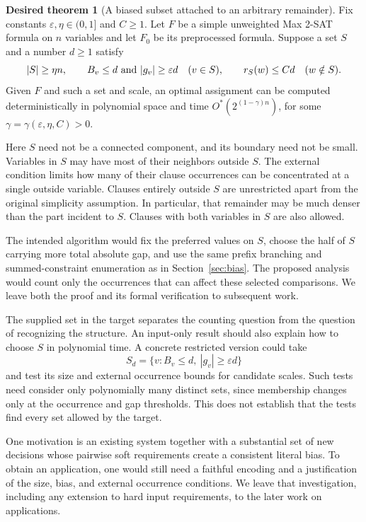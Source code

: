 \documentclass[11pt,a4paper]{article}
\theoremstyle{definition}
\newtheorem{target}[theorem]{Desired theorem}
\theoremstyle{remark}
\newcommand{\Ostar}{O^{*}}
\begin{document}
\begin{target}[A biased subset attached to an arbitrary remainder]
\label{target:biased_subset}
Fix constants $\varepsilon,\eta\in(0,1]$ and $C\ge1$.
Let $F$ be a simple unweighted Max 2-SAT formula on $n$ variables and
let $F_0$ be its preprocessed formula. Suppose a set $S$ and a number
$d\ge1$ satisfy
\[
 |S|\ge\eta n,\qquad
 B_v\le d\ \hbox{and}\ |g_v|\ge\varepsilon d\quad(v\in S),
 \qquad r_S(w)\le Cd\quad(w\notin S).
\]
Given $F$ and such a set and scale, an optimal assignment can be computed
deterministically in polynomial space and time
$\Ostar(2^{(1-\gamma)n})$, for some
$\gamma=\gamma(\varepsilon,\eta,C)>0$.
\end{target}

Here $S$ need not be a connected component, and its boundary need not
be small. Variables in $S$ may have most of their neighbors outside
$S$. The external condition limits how many of their clause occurrences
can be concentrated at a single outside variable. Clauses entirely
outside $S$ are unrestricted apart from the original simplicity
assumption. In particular, that remainder may be much denser than the
part incident to $S$. Clauses with both variables in $S$ are also allowed.

The intended algorithm would fix the preferred values on $S$, choose
the half of $S$ carrying more total absolute gap, and use the same
prefix branching and summed-constraint enumeration as in
Section~\ref{sec:bias}. The proposed analysis would count only the
occurrences that can affect these selected comparisons. We leave both
the proof and its formal verification to subsequent work.

The supplied set in the target separates the counting question from
the question of recognizing the structure. An input-only result should
also explain how to choose $S$ in polynomial time. A concrete restricted
version could take
\[
 S_d=\{v:B_v\le d,\ |g_v|\ge\varepsilon d\}
\]
and test its size and external occurrence bounds for candidate scales.
Such tests need consider only polynomially many distinct sets, since
membership changes only at the occurrence and gap thresholds. This
does not establish that the tests find every set allowed by the target.

One motivation is an existing system together with a substantial set
of new decisions whose pairwise soft requirements create a consistent
literal bias. To obtain an application, one would still need a faithful
encoding and a justification of the size, bias, and external occurrence
conditions. We leave that investigation, including any extension to
hard input requirements, to the later work on applications.
\end{document}
